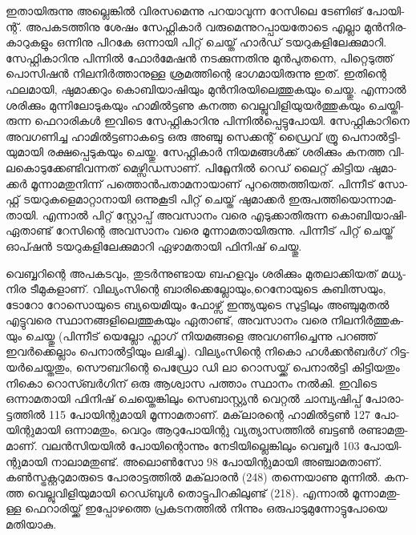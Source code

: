 ഇ­താ­യി­രു­ന്നു അല്ലെ­ങ്കില്‍ വി­ര­സ­മെ­ന്നു പറ­യാ­വു­ന്ന റേ­സി­ലെ ടേ­ണി­ങ് പോ­യി­ന്റ്. അപ­ക­ട­ത്തി­നു ശേ­ഷം സേ­ഫ്റ്റി­കാര്‍ 
വരു­മെ­ന്നു­റ­പ്പാ­യ­തോ­ടെ എല്ലാ മുന്‍­നി­ര­കാ­റു­ക­ളും ഒന്നി­നു പി­റ­കേ ഒന്നാ­യി പി­റ്റ് ചെ­യ്ത് ഹാര്‍­ഡ് ടയ­റു­ക­ളി­ലേ­ക്കു­മാ­റി. 
സേ­ഫ്റ്റി­കാ­റി­നു പി­ന്നില്‍ ഫോര്‍­മേ­ഷന്‍ നട­ക്കു­ന്ന­തി­നു മുന്‍­പു­ത­ന്നെ, പി­റ്റെ­ടു­ത്ത് പൊ­സി­ഷന്‍ നി­ല­നിര്‍­ത്താ­നു­ള്ള 
ശ്ര­മ­ത്തി­ന്റെ ഭാ­ഗ­മാ­യി­രു­ന്നു ഇത്. ഇതി­ന്റെ ഫല­മാ­യി, ഷു­മാ­ക്ക­റും കൊ­ബി­യാ­ഷി­യും മുന്‍­നി­ര­യി­ലെ­ത്തു­ക­യും ചെ­യ്തു. 
എന്നാല്‍ ശരി­ക്കും മു­ന്നി­ലോ­ടു­ക­യും ഹാ­മില്‍­ട്ട­ണു കന­ത്ത വെ­ല്ലു­വി­ളി­യു­യര്‍­ത്തു­ക­യും ചെ­യ്തി­രു­ന്ന ഫെ­റാ­രി­കള്‍ ഇവി­ടെ 
സേ­ഫ്റ്റി­കാ­റി­നു പി­ന്നില്‍­പ്പെ­ട്ടു­പോ­യി. സേ­ഫ്റ്റി­കാ­റി­നെ അവ­ഗ­ണി­ച്ച ഹാ­മില്‍­ട്ട­ണാ­ക­ട്ടെ ഒരു അഞ്ചു സെ­ക്ക­ന്റ് ഡ്രൈ­വ് ത്രൂ 
പെ­നാല്‍­ട്ടി­യു­മാ­യി രക്ഷ­പ്പെ­ടു­ക­യും ചെ­യ്തു. സേ­ഫ്റ്റി­കാര്‍ നി­യ­മ­ങ്ങള്‍­ക്ക് ശരി­ക്കും കന­ത്ത വി­ല­കൊ­ടു­ക്കേ­ണ്ടി­വ­ന്ന­ത് 
മെ­ഴ്സി­ഡ­സാ­ണ്. പി­റ്റ്ലേ­നില്‍ റെ­ഡ് ലൈ­റ്റ് കി­ട്ടിയ ഷു­മാ­ക്കര്‍ മൂ­ന്നാ­മ­തു­നി­ന്ന് പത്തൊന്‍­പ­താ­മ­നാ­യാ­ണ് പു­റ­ത്തെ­ത്തി­യ­ത്. 
പി­ന്നീ­ട് സോ­ഫ്റ്റ് ടയ­റു­ക­ളെ­മാ­റ്റാ­നാ­യി ഒന്നു­കൂ­ടി പി­റ്റ് ചെ­യ്ത് ഷു­മാ­ക്കര്‍ ഇരു­പ­ത്തി­യൊ­ന്നാ­മ­താ­യി. എന്നാല്‍ പി­റ്റ് 
സ്റ്റോ­പ്പ് അവ­സാ­നം വരെ എടു­ക്കാ­തി­രു­ന്ന ­കൊ­ബി­യാ­ഷി­ ഏതാ­ണ്ട് റേ­സി­ന്റെ അവ­സാ­നം വരെ മൂ­ന്നാ­മ­താ­യി­രു­ന്നു. 
പി­ന്നീ­ട് പി­റ്റ് ചെ­യ്ത് ഓപ്ഷന്‍ ടയ­റു­ക­ളി­ലേ­ക്കു­മാ­റി ഏഴാ­മ­താ­യി ഫി­നി­ഷ് ചെ­യ്തു­.

­വെ­ബ്ബ­റി­ന്റെ അപ­ക­ട­വും, തു­ടര്‍­ന്നു­ണ്ടായ ബഹ­ള­വും ശരി­ക്കും മു­ത­ലാ­ക്കി­യ­ത് മധ്യ­നിര ടീ­മു­ക­ളാ­ണ്. വി­ല്യം­സി­ന്റെ 
ബാ­രി­ക്കെ­ല്ലോ­യും­,­റെ­നോ­യു­ടെ കു­ബി­ത്സ­യും, ടോ­റോ റോ­സൊ­യു­ടെ ബ്യ­യെ­മി­യും ഫോ­ഴ്സ് ഇന്ത്യ­യു­ടെ സു­ട്ടി­ലും 
അഞ്ചു­മു­തല്‍ എട്ടു­വ­രെ സ്ഥാ­ന­ങ്ങ­ളി­ലെ­ത്തു­ക­യും ഏതാ­ണ്ട്, അവ­സാ­നം വരെ നി­ല­നിര്‍­ത്തു­ക­യും ചെ­യ്തു (പി­ന്നീ­ട് 
യെ­ല്ലോ ഫ്ലാ­ഗ് നി­യ­മ­ങ്ങ­ളെ അവ­ഗ­ണി­ച്ചെ­ന്നു പറ­ഞ്ഞ് ഇവര്‍­ക്കെ­ല്ലാം പെ­നാല്‍­ട്ടി­യും ലഭി­ച്ചു­). വി­ല്യം­സി­ന്റെ ­നി­കൊ 
ഹള്‍­ക്കന്‍­ബര്‍­ഗ് റി­ട്ട­യര്‍­ചെ­യ്ത­തും, സൌ­ബ­റി­ന്റെ പെ­ഡ്രോ ഡി ലാ റൊ­സ­യ്ക്ക് പെ­നാല്‍­ട്ടി കി­ട്ടി­യ­തും നി­കൊ 
റൊ­സ്ബര്‍­ഗി­ന് ഒരു ആശ്വാസ പത്താം സ്ഥാ­നം നല്‍­കി. ഇവി­ടെ ഒന്നാ­മ­താ­യി ഫി­നി­ഷ് ചെ­യ്തെ­ങ്കി­ലും ­സെ­ബാ­സ്റ്റ്യന്‍ 
വെ­റ്റല്‍ ചാ­മ്പ്യ­ഷി­പ്പ് പോ­രാ­ട്ട­ത്തില്‍ 115 പോ­യി­ന്റു­മാ­യി മൂ­ന്നാ­മ­താ­ണ്. മക്‌­ലാ­ര­ന്റെ ഹാ­മില്‍­ട്ടണ്‍ 127 പോ­യി­ന്റു­മാ­യി 
ഒന്നാ­മ­തും, വെ­റും ആറു­പോ­യി­ന്റു വ്യ­ത്യാ­സ­ത്തില്‍ ബട്ടണ്‍ രണ്ടാ­മ­തു­മാ­ണ്. വലന്‍­സി­യ­യില്‍ പോ­യി­ന്റൊ­ന്നും 
നേ­ടി­യി­ല്ലെ­ങ്കി­ലും വെ­ബ്ബര്‍ 103 പോ­യി­ന്റു­മാ­യി നാ­ലാ­മ­തു­ണ്ട്. അലൊണ്‍­സോ 98 പോ­യി­ന്റു­മാ­യി അഞ്ചാ­മ­താ­ണ്. 
കണ്‍­സ്ട്ര­ക്റ്റ­റു­മാ­രു­ടെ പോ­രാ­ട്ട­ത്തില്‍ മക്‌­ലാ­രന്‍ (248) തന്നെ­യാ­ണു മു­ന്നില്‍. കന­ത്ത വെ­ല്ലു­വി­ളി­യു­മാ­യി റെ­ഡ്ബുള്‍ 
തൊ­ട്ടു­പി­റ­കി­ലു­ണ്ട് (218). എന്നാല്‍ മൂ­ന്നാ­മ­തു­ള്ള ഫെ­റാ­രി­യ്ക്ക് ഇപ്പോ­ഴ­ത്തെ പ്ര­ക­ട­ന­ത്തില്‍ നി­ന്നും 
ഒരു­പാ­ടു­മു­ന്നോ­ട്ടു­പോ­യെ മതി­യാ­കു­.

